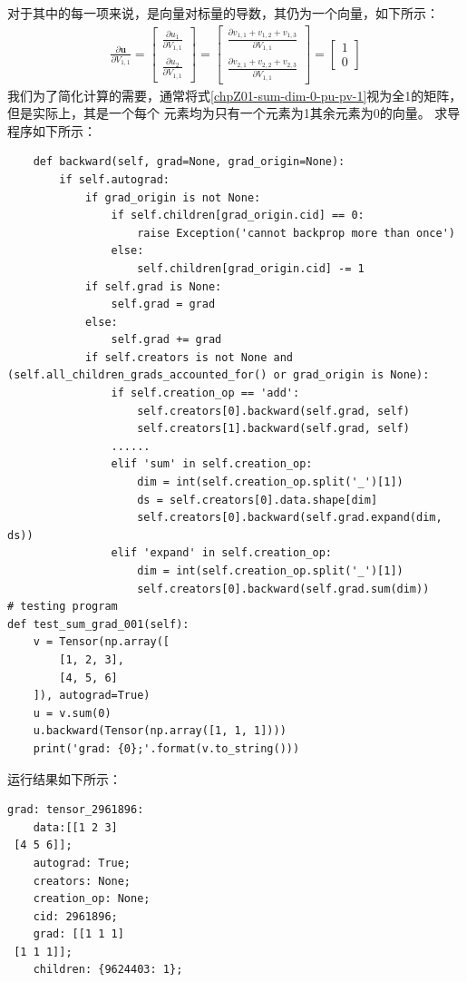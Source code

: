 对于其中的每一项来说，是向量对标量的导数，其仍为一个向量，如下所示：
\begin{equation}
\begin{aligned}
\frac{\partial{\boldsymbol{u}}}{\partial{V_{1,1}}}=\begin{bmatrix}
	\frac{\partial{u_{1}}}{\partial{V_{1,1}}} \\
	\frac{\partial{u_{2}}}{\partial{V_{1,1}}}
\end{bmatrix} = \begin{bmatrix}
	\frac{\partial{v_{1,1} + v_{1,2} + v_{1,3}}} {\partial{V_{1,1}}} \\
	\frac{\partial{v_{2,1} + v_{2,2} + v_{2,3}}} {\partial{V_{1,1}}}
\end{bmatrix}=\begin{bmatrix}
	1 \\ 
	0
\end{bmatrix}
\end{aligned}
\label{chpZ01-sum-dim-0-pu-pv-1}
\end{equation}
我们为了简化计算的需要，通常将式\ref{chpZ01-sum-dim-0-pu-pv-1}视为全1的矩阵，但是实际上，其是一个每个
元素均为只有一个元素为1其余元素为0的向量。
求导程序如下所示：
\begin{lstlisting}
    def backward(self, grad=None, grad_origin=None):
        if self.autograd:
            if grad_origin is not None:
                if self.children[grad_origin.cid] == 0:
                    raise Exception('cannot backprop more than once')
                else:
                    self.children[grad_origin.cid] -= 1
            if self.grad is None:
                self.grad = grad
            else:
                self.grad += grad
            if self.creators is not None and (self.all_children_grads_accounted_for() or grad_origin is None):
                if self.creation_op == 'add':
                    self.creators[0].backward(self.grad, self)
					self.creators[1].backward(self.grad, self)
				......
                elif 'sum' in self.creation_op:
                    dim = int(self.creation_op.split('_')[1])
                    ds = self.creators[0].data.shape[dim]
                    self.creators[0].backward(self.grad.expand(dim, ds))
                elif 'expand' in self.creation_op:
                    dim = int(self.creation_op.split('_')[1])
					self.creators[0].backward(self.grad.sum(dim))
# testing program
def test_sum_grad_001(self):
	v = Tensor(np.array([
		[1, 2, 3],
		[4, 5, 6]
	]), autograd=True)
	u = v.sum(0)
	u.backward(Tensor(np.array([1, 1, 1])))
	print('grad: {0};'.format(v.to_string()))
\end{lstlisting}
运行结果如下所示：
\begin{lstlisting}
grad: tensor_2961896:
    data:[[1 2 3]
 [4 5 6]];
    autograd: True;
    creators: None;
    creation_op: None;
    cid: 2961896;
    grad: [[1 1 1]
 [1 1 1]];
    children: {9624403: 1};
\end{lstlisting}

